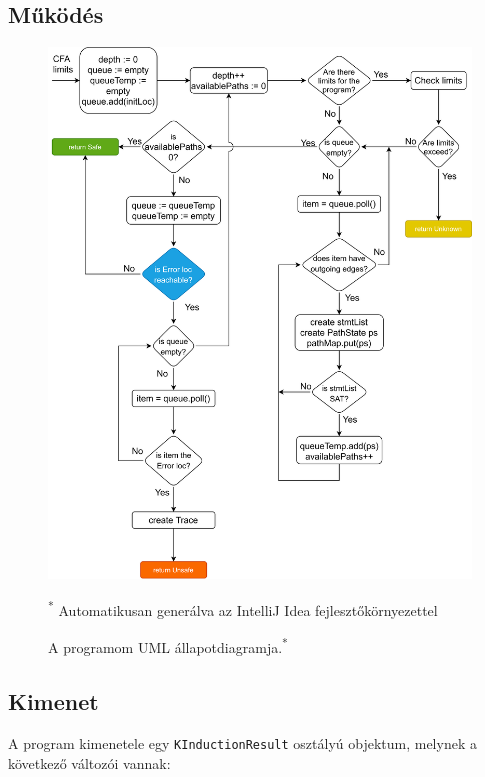 \subsection{Működés}
\begin{figure}[!ht]
	\centering
	\includegraphics[width=150mm, keepaspectratio]{figures/eztutijo3.png}
	\caption[Caption for LOF]{A programom UML állapotdiagramja.\textsuperscript{*}}
	\small\textsuperscript{*} Automatikusan generálva az IntelliJ Idea fejlesztőkörnyezettel
	\label{fig:state_diagram2}
\end{figure}

\subsection{Kimenet}
A program kimenetele egy \verb+KInductionResult+ osztályú objektum, melynek a következő változói vannak:

